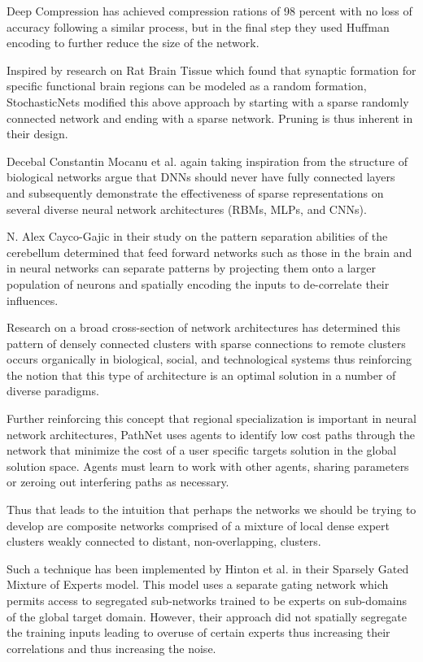 \documentclass{llncs}
\begin{document}
Deep Compression has achieved compression rations of 98 percent with no loss of accuracy following a similar process, but in the final step they used Huffman encoding to further reduce the size of the network.

Inspired by research on Rat Brain Tissue which found that synaptic formation for specific functional brain regions can be modeled as a random formation, StochasticNets modified this above approach by starting with a sparse randomly connected network and ending with a sparse network. Pruning is thus inherent in their design.

Decebal Constantin Mocanu et al. again taking inspiration from the structure of biological networks argue that DNNs should never have fully connected layers and subsequently demonstrate the effectiveness of sparse representations on several diverse neural network architectures (RBMs, MLPs, and CNNs).

N. Alex Cayco-Gajic in their study on the pattern separation abilities of the cerebellum determined that feed forward networks such as those in the brain and in neural networks can separate patterns by projecting them onto a larger population of neurons and spatially encoding the inputs to de-correlate their influences.

Research on a broad cross-section of network architectures has determined this pattern of densely connected clusters with sparse connections to remote clusters occurs organically in biological, social, and technological systems thus reinforcing the notion that this type of architecture is an optimal solution in a number of diverse paradigms.

Further reinforcing this concept that regional specialization is important in neural network architectures, PathNet uses agents to identify low cost paths through the network that minimize the cost of a user specific targets solution in the global solution space. Agents must learn to work with other agents, sharing parameters or zeroing out interfering paths as necessary.

Thus that leads to the intuition that perhaps the networks we should be trying to develop are composite networks comprised of a mixture of local dense expert clusters weakly connected to distant, non-overlapping, clusters.

Such a technique has been implemented by Hinton et al. in their Sparsely Gated Mixture of Experts model.  This model uses a separate gating network which permits access to segregated sub-networks trained to be experts on sub-domains of the global target domain.  However, their approach did not spatially segregate the training inputs leading to overuse of certain experts thus increasing their correlations and thus increasing the noise.
\end{document}
